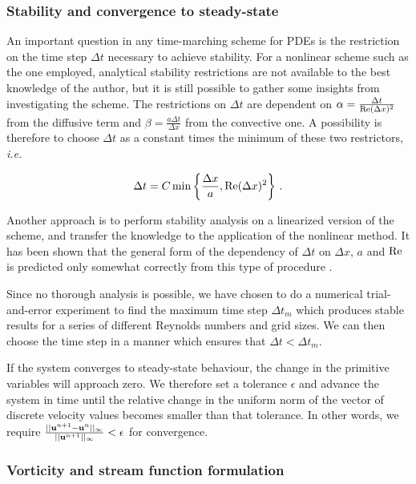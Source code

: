 \documentclass[final,3p,twocolumn]{elsarticle}
\begin{document}
\subsubsection{Stability and convergence to steady-state}

An important question in any time-marching scheme for PDEs is the restriction
on the time step $\Delta t$ necessary to achieve stability. For a nonlinear
scheme such as the one employed, analytical stability restrictions are not
available to the best knowledge of the author, but it is still possible to
gather some insights from investigating the scheme. The restrictions on $\Delta
t$ are dependent on $\alpha = \frac{\Delta t}{{\rm Re} (\Delta x)^2}$ from the 
diffusive term and $\beta = \frac{a \Delta t}{\Delta x}$ from the convective
one. A possibility is therefore to choose $\Delta t$ as a constant times the
minimum of these two restrictors, {\em i.e.\ } 

\begin{equation}
    \Delta t = C \min \left\{ \frac{\Delta x}{a}, {\rm Re} (\Delta x)^2
    \right\} \,.
    \label{eq:timeStep}
\end{equation}
 
Another approach is to perform stability analysis on a linearized version of
the scheme, and transfer the knowledge to the application of the nonlinear
method. It has been shown that the general form of the dependency of $\Delta
t$ on $\Delta x$, $a$ and ${\rm Re}$ is predicted only somewhat correctly from
this type of procedure \cite{kress2006time}. 

Since no thorough analysis is possible, we have chosen to do a numerical
trial-and-error experiment to find the maximum time step $\Delta t_m$ which
produces stable results for a series of different Reynolds numbers and grid
sizes. We can then choose the time step in a manner which ensures that $\Delta
t < \Delta t_m$. 

If the system converges to steady-state behaviour, the change in the primitive
variables will approach zero. We therefore set a tolerance $\epsilon$ and
advance the system in time until the relative change in the uniform norm of
the vector of discrete velocity values becomes smaller than that tolerance.  In
other words, we require $\frac{||{\bf u}^{n+1} - {\bf u}^{n}||_{\infty}}{||{\bf
u}^{n+1}||_{\infty}} < \epsilon$ for convergence. 

\subsubsection{Vorticity and stream function formulation}
\end{document}
